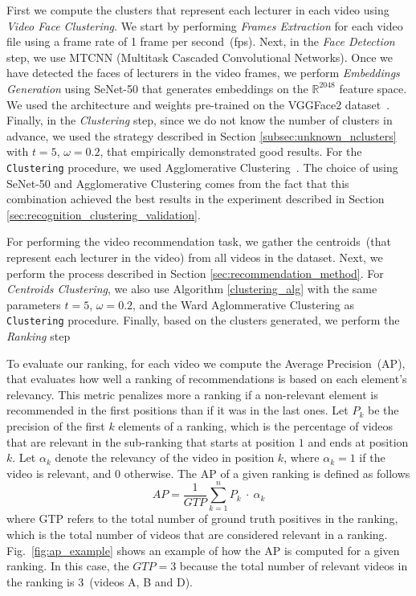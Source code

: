 First we compute the clusters that represent each lecturer in each video using \emph{Video Face Clustering}. 
We start by performing \emph{Frames Extraction} for each video file using a frame rate of 1 frame per second~(fps). 
Next, in the \emph{Face Detection} step, we use MTCNN \cite{mtcnn} (Multitask
Cascaded Convolutional Networks).
Once we have detected the faces of lecturers in the video frames, we perform \emph{Embeddings Generation} using SeNet-50 \cite{senet} that generates embeddings on the $\mathbb{R}^{2048}$ feature space. 
We used the architecture and weights pre-trained on the VGGFace2 dataset~\cite{cao2018vggface2}.
Finally, in the \emph{Clustering} step, since we do not know the number of clusters in advance, we used the strategy described in Section \ref{subsec:unknown_nclusters} with $t=5$, $\omega=0.2$, that empirically demonstrated good results. For the \texttt{Clustering} procedure, we used Agglomerative Clustering~\cite{ward1963hierarchical}.
The choice of using SeNet-50 and Agglomerative Clustering comes from the fact that this combination achieved the best results in the experiment described in Section \ref{sec:recognition_clustering_validation}.

For performing the video recommendation task, we gather the centroids~(that represent each lecturer in the video) from all videos in the dataset. Next, we perform the process described in Section \ref{sec:recommendation_method}. For \emph{Centroids Clustering}, we also use Algorithm \ref{clustering_alg} with the same parameters $t=5$, $\omega=0.2$, and the Ward Aglommerative Clustering as \texttt{Clustering} procedure. Finally, based on the clusters generated, we perform the \emph{Ranking} step

To evaluate our ranking, for each video we compute the Average Precision~(AP), that evaluates how well a ranking of recommendations is based on each element's relevancy. 
This metric penalizes more a ranking if a non-relevant element is recommended in the first positions than if it was in the last ones.
Let $P_k$ be the precision of the first $k$ elements of a ranking, which is the percentage of videos that are relevant in the sub-ranking that starts at position $1$ and ends at position $k$.
Let $\alpha_k$ denote the relevancy of the video in position $k$, where $\alpha_k = 1$ if the video is relevant, and $0$ otherwise.
The AP of a given ranking is defined as follows
\begin{equation}
  \label{equation:average_precision}
  AP = \frac{1}{GTP}\sum_{k=1}^{n}{P_k~\cdot~\alpha_k}
\end{equation}
where GTP refers to the total number of ground truth positives in the ranking, which is the total number of videos that are considered relevant in a ranking. Fig.~\ref{fig:ap_example} shows an example of how the AP is computed for a given ranking. In this case, the $GTP=3$ because the total number of relevant videos in the ranking is 3~(videos A, B and D).

